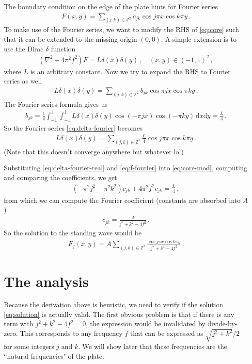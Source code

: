 \documentclass[]{article}
\newcommand{\ud}{\mathrm{d}}
\begin{document}
The boundary condition on the edge of the plate hints for Fourier series
\begin{align}
F(x, y) = \sum_{(j,k)\in\mathbb{Z}^2} c_{jk} \cos j\pi x \cos k\pi y\,. \label{eq:f-fourier}
\end{align} 
To make use of the Fourier series, we want to modify the RHS of \eqref{eq:core} such that it can be extended to the missing origin $(0, 0)$. A simple extension is to use the Dirac $\delta$ function 
\begin{align}
(\nabla^2 + 4\pi^2 f^2) F = L \delta(x)\delta(y)\,,\quad (x, y) \in (-1, 1)^2\,, \label{eq:core-mod}
\end{align}
where $L$ is an arbitrary constant. Now we try to expand the RHS to Fourier series as well
\begin{align}
L \delta(x)\delta(y) = \sum_{(j,k)\in\mathbb{Z}^2} b_{jk} \cos \pi j x \cos \pi k y\,.\label{eq:delta-fourier}
\end{align}
The Fourier series formula gives us
\begin{align}
b_{jk}=\frac{1}{4}\int_{-1}^{1}\int_{-1}^{1}L \delta(x)\delta(y) \cos(-\pi j x) \cos(-\pi ky)\,\ud x\ud y = \frac{L}{4}\,.
\end{align}
So the Fourier series \eqref{eq:delta-fourier} becomes
\begin{align}
L \delta(x)\delta(y) = \sum_{(j,k)\in\mathbb{Z}^2} \frac{L}{4} \cos j\pi x \cos k\pi y\,.\label{eq:delta-fourier-real}
\end{align}
(Note that this doesn't converge anywhere but whatever lol)

Substituting \eqref{eq:delta-fourier-real} and \eqref{eq:f-fourier} into \eqref{eq:core-mod}, computing and comparing the coefficients, we get
\begin{align}
(-\pi^2 j^2 - \pi^2 k^2)c_{jk} + 4\pi^2 f^2 c_{jk} = \frac{L}{4}\,,
\end{align}
from which we can compute the Fourier coefficient (constants are absorbed into $A$)
\begin{align}
c_{jk} = \frac{A}{j^2 + k^2 - 4f^2}\,.
\end{align}
So the solution to the standing wave would be
\begin{align}
F_f(x, y) = A \sum_{(j,k)\in\mathbb{Z}^2} \frac{\cos j\pi x \cos k\pi y}{j^2 + k^2 - 4f^2}\,. \label{eq:solution}
\end{align}

\section{The analysis}
Because the derivation above is heuristic, we need to verify if the solution \eqref{eq:solution} is actually valid. The first obvious problem is that if there is any term with $j^2 + k^2 - 4f^2 = 0$, the expression would be invalidated by divide-by-zero. This corresponds to any frequency $f$ that can be expressed as $\sqrt{j^2 + k^2} / 2$ for some integers $j$ and $k$. We will show later that these frequencies are the ``natural frequencies" of the plate.
\end{document}
